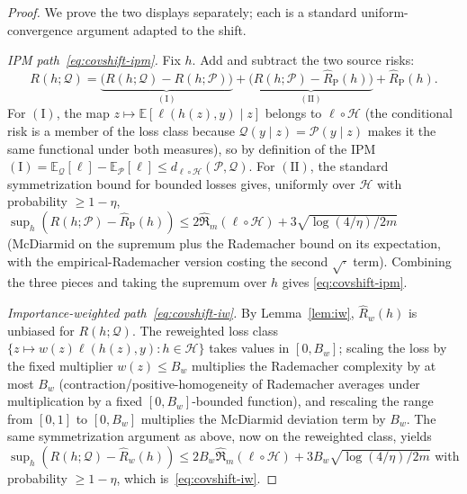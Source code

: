 \documentclass[aps,prresearch,reprint,amsmath,amssymb,nofootinbib,superscriptaddress,floatfix]{revtex4-2}
\theoremstyle{definition}
\theoremstyle{remark}
\theoremstyle{plain}
\begin{document}
\begin{proof}
We prove the two displays separately; each is a standard uniform-convergence argument adapted to the shift.

\emph{IPM path~\eqref{eq:covshift-ipm}.} Fix $h$. Add and subtract the two source risks:
\begin{equation}
R(h;\mathcal Q)=\underbrace{\big(R(h;\mathcal Q)-R(h;\mathcal P)\big)}_{(\mathrm I)}
+\underbrace{\big(R(h;\mathcal P)-\widehat R_{\mathrm P}(h)\big)}_{(\mathrm{II})}
+\widehat R_{\mathrm P}(h).
\end{equation}
For $(\mathrm I)$, the map $z\mapsto\mathbb E[\ell(h(z),y)\mid z]$ belongs to $\ell\circ\mathcal H$ (the
conditional risk is a member of the loss class because $\mathcal Q(y\mid z)=\mathcal P(y\mid z)$ makes it the
same functional under both measures), so by definition of the IPM
$(\mathrm I)=\mathbb E_{\mathcal Q}[\ell]-\mathbb E_{\mathcal P}[\ell]\le d_{\ell\circ\mathcal
H}(\mathcal P,\mathcal Q)$. For $(\mathrm{II})$, the standard symmetrization bound for bounded losses gives,
uniformly over $\mathcal H$ with probability $\ge1-\eta$, $\sup_{h}(R(h;\mathcal P)-\widehat R_{\mathrm
P}(h))\le 2\widehat{\mathfrak R}_m(\ell\circ\mathcal H)+3\sqrt{\log(4/\eta)/2m}$ (McDiarmid on the
supremum plus the Rademacher bound on its expectation, with the empirical-Rademacher version costing the
second $\sqrt{\cdot}$ term). Combining the three pieces and taking the supremum over $h$ gives
\eqref{eq:covshift-ipm}.

\emph{Importance-weighted path~\eqref{eq:covshift-iw}.} By Lemma~\ref{lem:iw}, $\widehat R_w(h)$ is unbiased
for $R(h;\mathcal Q)$. The reweighted loss class $\{z\mapsto w(z)\ell(h(z),y):h\in\mathcal H\}$ takes values
in $[0,B_w]$; scaling the loss by the fixed multiplier $w(z)\le B_w$ multiplies the Rademacher complexity by
at most $B_w$ (contraction/positive-homogeneity of Rademacher averages under multiplication by a fixed
$[0,B_w]$-bounded function), and rescaling the range from $[0,1]$ to $[0,B_w]$ multiplies the McDiarmid
deviation term by $B_w$. The same symmetrization argument as above, now on the reweighted class, yields
$\sup_h(R(h;\mathcal Q)-\widehat R_w(h))\le 2B_w\widehat{\mathfrak R}_m(\ell\circ\mathcal
H)+3B_w\sqrt{\log(4/\eta)/2m}$ with probability $\ge1-\eta$, which is~\eqref{eq:covshift-iw}.
\end{proof}
\end{document}
